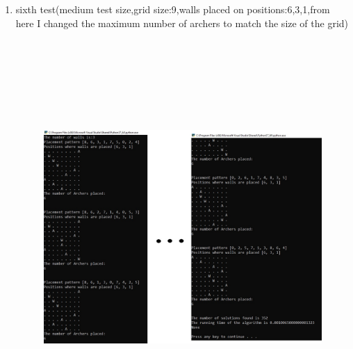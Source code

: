 \documentclass{article}
\begin{document}
\begin{enumerate}
\newpage
\item sixth test(medium test size,grid size:9,walls placed on positions:6,3,1,from here I changed the maximum number of archers to match the size of the grid)
\begin{figure}[h]
\includegraphics[width=12 cm, height=15cm]{test6}
\end{figure}


\end{enumerate}
\end{document}
